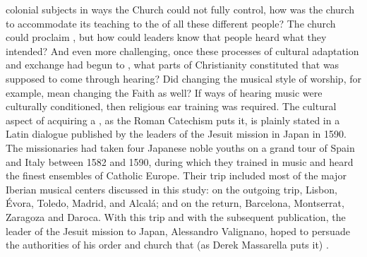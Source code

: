 colonial subjects in ways the Church could not fully control, how was the church
to accommodate its teaching to the  of all these
different people?
The church could proclaim , but how could leaders know that
people heard what they intended?
And even more challenging, once these processes of cultural adaptation and
exchange had begun to , what parts of Christianity constituted
 that was supposed to come through hearing?
Did changing the musical style of worship, for example, mean changing the Faith
as well?
If ways of hearing music were culturally conditioned, then religious ear
training was required.
The cultural aspect of acquiring a , as the Roman
Catechism puts it, is plainly stated in a Latin dialogue published by the
leaders of the Jesuit mission in Japan in 1590.%
    \Autocite{Sande:DeMissioneLegatorum}
The missionaries had taken four Japanese noble youths on a grand tour of Spain
and Italy between 1582 and 1590, during which they trained in music and heard
the finest ensembles of Catholic Europe.
Their trip included most of the major Iberian musical centers discussed in this
study: on the outgoing trip, Lisbon, Évora, Toledo, Madrid, and Alcalá; and on
the return, Barcelona, Montserrat, Zaragoza and Daroca.
With this trip and with the subsequent publication, the leader of the Jesuit
mission to Japan, Alessandro Valignano, hoped to persuade the authorities of his
order and church that (as Derek Massarella puts it) .%
    \Autocite[4]{Massarella:JapaneseTravellers}

